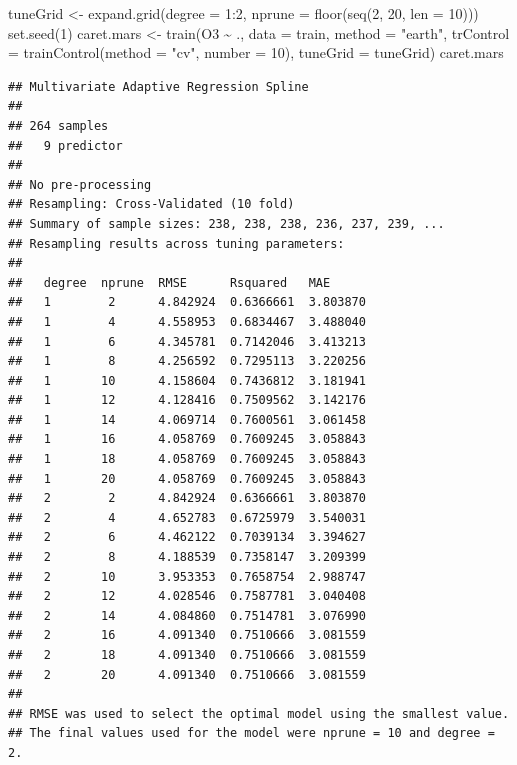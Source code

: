 \documentclass[
  spanish,
]{book}
\newenvironment{Shaded}{\begin{snugshade}}{\end{snugshade}}
\newcommand{\AttributeTok}[1]{\textcolor[rgb]{0.77,0.63,0.00}{#1}}
\newcommand{\DecValTok}[1]{\textcolor[rgb]{0.00,0.00,0.81}{#1}}
\newcommand{\FunctionTok}[1]{\textcolor[rgb]{0.00,0.00,0.00}{#1}}
\newcommand{\NormalTok}[1]{#1}
\newcommand{\OtherTok}[1]{\textcolor[rgb]{0.56,0.35,0.01}{#1}}
\newcommand{\SpecialCharTok}[1]{\textcolor[rgb]{0.00,0.00,0.00}{#1}}
\newcommand{\StringTok}[1]{\textcolor[rgb]{0.31,0.60,0.02}{#1}}
\theoremstyle{break}
\theoremstyle{definition}
\theoremstyle{definition}
\theoremstyle{definition}
\theoremstyle{definition}
\theoremstyle{remark}
\begin{document}
\begin{Shaded}
\begin{Highlighting}[]
\NormalTok{tuneGrid }\OtherTok{\textless{}{-}} \FunctionTok{expand.grid}\NormalTok{(}\AttributeTok{degree =} \DecValTok{1}\SpecialCharTok{:}\DecValTok{2}\NormalTok{, }
                       \AttributeTok{nprune =} \FunctionTok{floor}\NormalTok{(}\FunctionTok{seq}\NormalTok{(}\DecValTok{2}\NormalTok{, }\DecValTok{20}\NormalTok{, }\AttributeTok{len =} \DecValTok{10}\NormalTok{)))}
\FunctionTok{set.seed}\NormalTok{(}\DecValTok{1}\NormalTok{)}
\NormalTok{caret.mars }\OtherTok{\textless{}{-}} \FunctionTok{train}\NormalTok{(O3 }\SpecialCharTok{\textasciitilde{}}\NormalTok{ ., }\AttributeTok{data =}\NormalTok{ train, }\AttributeTok{method =} \StringTok{"earth"}\NormalTok{,}
    \AttributeTok{trControl =} \FunctionTok{trainControl}\NormalTok{(}\AttributeTok{method =} \StringTok{"cv"}\NormalTok{, }\AttributeTok{number =} \DecValTok{10}\NormalTok{),}
    \AttributeTok{tuneGrid =}\NormalTok{ tuneGrid)}
\NormalTok{caret.mars}
\end{Highlighting}
\end{Shaded}

\begin{verbatim}
## Multivariate Adaptive Regression Spline 
## 
## 264 samples
##   9 predictor
## 
## No pre-processing
## Resampling: Cross-Validated (10 fold) 
## Summary of sample sizes: 238, 238, 238, 236, 237, 239, ... 
## Resampling results across tuning parameters:
## 
##   degree  nprune  RMSE      Rsquared   MAE     
##   1        2      4.842924  0.6366661  3.803870
##   1        4      4.558953  0.6834467  3.488040
##   1        6      4.345781  0.7142046  3.413213
##   1        8      4.256592  0.7295113  3.220256
##   1       10      4.158604  0.7436812  3.181941
##   1       12      4.128416  0.7509562  3.142176
##   1       14      4.069714  0.7600561  3.061458
##   1       16      4.058769  0.7609245  3.058843
##   1       18      4.058769  0.7609245  3.058843
##   1       20      4.058769  0.7609245  3.058843
##   2        2      4.842924  0.6366661  3.803870
##   2        4      4.652783  0.6725979  3.540031
##   2        6      4.462122  0.7039134  3.394627
##   2        8      4.188539  0.7358147  3.209399
##   2       10      3.953353  0.7658754  2.988747
##   2       12      4.028546  0.7587781  3.040408
##   2       14      4.084860  0.7514781  3.076990
##   2       16      4.091340  0.7510666  3.081559
##   2       18      4.091340  0.7510666  3.081559
##   2       20      4.091340  0.7510666  3.081559
## 
## RMSE was used to select the optimal model using the smallest value.
## The final values used for the model were nprune = 10 and degree = 2.
\end{verbatim}
\end{document}
